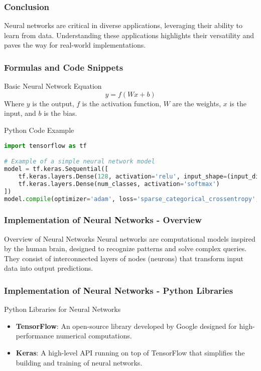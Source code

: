 \documentclass[aspectratio=169]{beamer}
\begin{document}
\begin{frame}[fragile]
    \frametitle{Conclusion}
    Neural networks are critical in diverse applications, leveraging their ability to learn from data. Understanding these applications highlights their versatility and paves the way for real-world implementations.
\end{frame}

\begin{frame}[fragile]
    \frametitle{Formulas and Code Snippets}
    \begin{block}{Basic Neural Network Equation}
        \begin{equation}
            y = f(Wx + b)
        \end{equation}
        Where \(y\) is the output, \(f\) is the activation function, \(W\) are the weights, \(x\) is the input, and \(b\) is the bias.
    \end{block}
    \begin{block}{Python Code Example}
        \begin{lstlisting}[language=Python]
import tensorflow as tf

# Example of a simple neural network model
model = tf.keras.Sequential([
    tf.keras.layers.Dense(128, activation='relu', input_shape=(input_dim,)),
    tf.keras.layers.Dense(num_classes, activation='softmax')
])
model.compile(optimizer='adam', loss='sparse_categorical_crossentropy', metrics=['accuracy'])
        \end{lstlisting}
    \end{block}
\end{frame}

\begin{frame}[fragile]
    \frametitle{Implementation of Neural Networks - Overview}
    \begin{block}{Overview of Neural Networks}
        Neural networks are computational models inspired by the human brain, designed to recognize patterns and solve complex queries. They consist of interconnected layers of nodes (neurons) that transform input data into output predictions.
    \end{block}
\end{frame}

\begin{frame}[fragile]
    \frametitle{Implementation of Neural Networks - Python Libraries}
    \begin{block}{Python Libraries for Neural Networks}
        \begin{itemize}
            \item \textbf{TensorFlow}: An open-source library developed by Google designed for high-performance numerical computations.
            \item \textbf{Keras}: A high-level API running on top of TensorFlow that simplifies the building and training of neural networks.
        \end{itemize}
    \end{block}
\end{frame}
\end{document}
